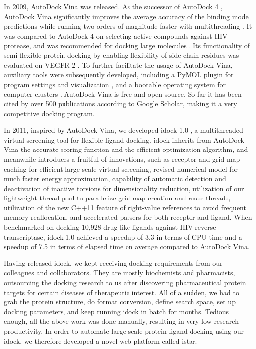 \documentclass[12pt]{article}
\begin{document}
In 2009, AutoDock Vina \citep{595} was released. As the successor of AutoDock 4 \citep{596}, AutoDock Vina significantly improves the average accuracy of the binding mode predictions while running two orders of magnitude faster with multithreading \citep{595}. It was compared to AutoDock 4 on selecting active compounds against HIV protease, and was recommended for docking large molecules \citep{556}. Its functionality of semi-flexible protein docking by enabling flexibility of side-chain residues was evaluated on VEGFR-2 \citep{1084}. To further facilitate the usage of AutoDock Vina, auxiliary tools were subsequently developed, including a PyMOL plugin for program settings and visualization \citep{609}, and a bootable operating system for computer clusters \citep{773}. AutoDock Vina is free and open source. So far it has been cited by over 500 publications according to Google Scholar, making it a very competitive docking program.

In 2011, inspired by AutoDock Vina, we developed idock 1.0 \citep{1153}, a multithreaded virtual screening tool for flexible ligand docking. idock inherits from AutoDock Vina the accurate scoring function and the efficient optimization algorithm, and meanwhile introduces a fruitful of innovations, such as receptor and grid map caching for efficient large-scale virtual screening, revised numerical model for much faster energy approximation, capability of automatic detection and deactivation of inactive torsions for dimensionality reduction, utilization of our lightweight thread pool to parallelize grid map creation and reuse threads, utilization of the new C++11 feature of right-value references to avoid frequent memory reallocation, and accelerated parsers for both receptor and ligand. When benchmarked on docking 10,928 drug-like ligands against HIV reverse transcriptase, idock 1.0 achieved a speedup of 3.3 in terms of CPU time and a speedup of 7.5 in terms of elapsed time on average compared to AutoDock Vina.

Having released idock, we kept receiving docking requirements from our colleagues and collaborators. They are mostly biochemists and pharmacists, outsourcing the docking research to us after discovering pharmaceutical protein targets for certain diseases of therapeutic interest. All of a sudden, we had to grab the protein structure, do format conversion, define search space, set up docking parameters, and keep running idock in batch for months. Tedious enough, all the above work was done manually, resulting in very low research productivity. In order to automate large-scale protein-ligand docking using our idock, we therefore developed a novel web platform called istar.
\end{document}
